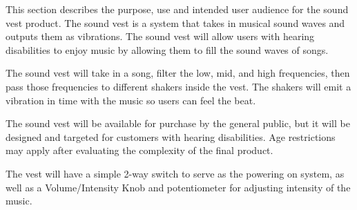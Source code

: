 This section describes the purpose, use and intended user audience for the sound vest product. The sound vest is a system that takes in musical sound waves and outputs them as vibrations. The sound vest will allow users with hearing disabilities to enjoy music by allowing them to fill the sound waves of songs.

The sound vest will take in a song, filter the low, mid, and high frequencies, then pass those frequencies to different shakers inside the vest. The shakers will emit a vibration in time with the music so users can feel the beat.

The sound vest will be available for purchase by the general public, but it will be designed and targeted for customers with hearing disabilities. Age restrictions may apply after evaluating the complexity of the final product.

The vest will have a simple 2-way switch to serve as the powering on system, as well as a Volume/Intensity Knob and potentiometer for adjusting intensity of the music.